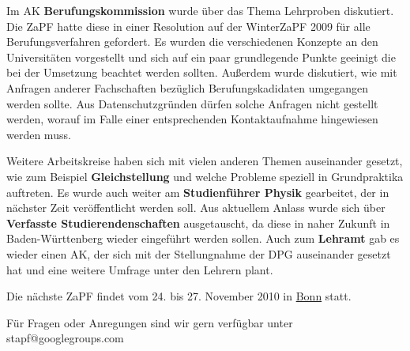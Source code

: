 \documentclass{scrartcl}
\begin{document}
Im AK \textbf{Berufungskommission} wurde über das Thema Lehrproben diskutiert. Die ZaPF hatte diese in einer
Resolution auf der WinterZaPF 2009 für alle Berufungsverfahren gefordert. Es
wurden die verschiedenen Konzepte an den Universitäten vorgestellt und sich auf ein paar grundlegende Punkte
geeinigt die bei der Umsetzung beachtet werden sollten. Außerdem wurde diskutiert, wie mit Anfragen anderer
Fachschaften bezüglich Berufungskadidaten umgegangen werden sollte. Aus Datenschutzgründen dürfen solche Anfragen
nicht gestellt werden, worauf im Falle einer entsprechenden Kontaktaufnahme hingewiesen werden muss.

Weitere Arbeitskreise haben sich mit vielen anderen Themen auseinander gesetzt, wie zum Beispiel
\textbf{Gleichstellung} und welche Probleme speziell in Grundpraktika auftreten. Es wurde auch weiter am
\textbf{Studienführer Physik} gearbeitet, der in nächster Zeit veröffentlicht werden soll. Aus aktuellem Anlass wurde
sich über \textbf{Verfasste Studierendenschaften} ausgetauscht, da diese in naher Zukunft in Baden-Württenberg wieder
eingeführt werden sollen. Auch zum \textbf{Lehramt} gab es wieder einen AK, der sich mit der
Stellungnahme der DPG auseinander gesetzt hat und eine weitere Umfrage unter
den Lehrern plant.

\vspace{0.5cm}
Die nächste ZaPF findet vom 24. bis 27. November 2010 in \href{http://zapfibo.de}{Bonn} statt.

Für Fragen oder Anregungen sind wir gern verfügbar unter stapf@googlegroups.com
\end{document}
